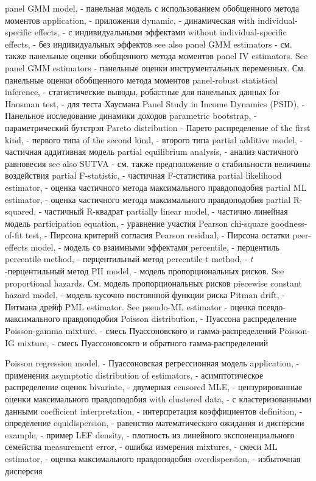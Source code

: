 panel GMM model, - панельная модель с использованием обобщенного метода моментов
application, - приложения
dynamic, - динамическая
with individual-specific effects, - с индивидуальными эффектами
without individual-specific effects, - без индивидуальных эффектов
see also panel GMM estimators - см. также панельные оценки обобщенного метода моментов
panel IV estimators. See panel GMM estimators - панельные оценки инструментальных переменных. См. панельные оценки обобщенного метода моментов
panel-robust statistical inference, - статистические выводы, робастные для панельных данных
for Hausman test, - для теста Хаусмана
Panel Study in Income Dynamics (PSID), - Панельное исследование динамики доходов
parametric bootstrap, - параметрический бутстрэп
Pareto distribution - Парето распределение
of the first kind, - первого типа
of the second kind, - второго типа
partial additive model, - частичная аддитивная модель
partial equilibrium analysis, - анализ частичного равновесия
see also SUTVA - см. также предположение о стабильности величины воздействия
partial F-statistic, - частичная F-статистика
partial likelihood estimator, - оценка частичного метода максимального правдоподобия
partial ML estimator, - оценка частичного метода максимального правдоподобия
partial R-squared, - частичный R-квадрат
partially linear model, - частично линейная модель
participation equation, - уравнение участия
Pearson chi-square goodness-of-fit test, - Пирсона критерий согласия
Pearson residual, - Пирсона остатки
peer-effects model, - модель со взаимными эффектами
percentile, - перцентиль
percentile method, - перцентильный метод
percentile-t method, - $t$-перцентильный метод
PH model, - модель пропорциональных рисков. See proportional hazards. См. модель пропорциональных рисков
piecewise constant hazard model, - модель кусочно постоянной функции риска 
Pitman drift, - Питмана дрейф
PML estimator. See pseudo-ML estimator - оценка псевдо-максимального правдоподобия
Poisson distribution, - Пуассона распределение
Poisson-gamma mixture, - смесь Пуассоновского и гамма-распределений
Poisson-IG mixture, - смесь Пуассоновсокго и обратного гамма-распределений

Poisson regression model, - Пуассоновская регрессионная модель
application, - применения
asymptotic distribution of estimators, - асимптотическое распределение оценок
bivariate, - двумерная
censored MLE, - цензурированные оценки максимального правдоподобия
with clustered data, - с кластеризованными данными
coefficient interpretation, - интерпретация коэффициентов
definition, - определение
equidispersion, - равенство математического ожидания и дисперсии
example, - пример
LEF density, - плотность из линейного экспоненциального семейства
measurement error, - ошибка измерения
mixtures, - смеси 
ML estimator, - оценка максимального правдоподобия
overdispersion, - избыточная дисперсия

